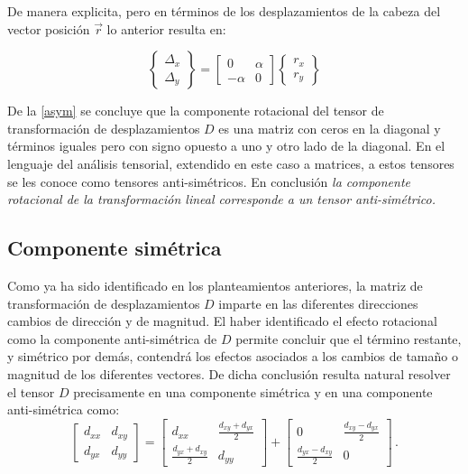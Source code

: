 \documentclass[../notas medios.tex]{subfiles}
\begin{document}
De manera explicita, pero en términos de los desplazamientos de la cabeza del vector posición $\vec{r}$ lo anterior resulta en:

\begin{equation}
\begin{Bmatrix}
\Delta_x\\
\Delta_y
\end{Bmatrix}=
\begin{bmatrix}
0 &\alpha \\
-\alpha &0
\end{bmatrix}
\begin{Bmatrix}
r_x\\
r_y
\end{Bmatrix}
\label{asym}
\end{equation}

De la \cref{asym} se concluye que la componente rotacional del tensor de 
transformación de desplazamientos $D$ es una matriz con ceros en la diagonal y 
términos iguales pero con signo opuesto a uno y otro lado de la diagonal. En el 
lenguaje del análisis tensorial, extendido en este caso a matrices, a estos 
tensores se les conoce como tensores anti-simétricos. En conclusión \emph{la 
componente rotacional de la transformación lineal corresponde a un tensor 
anti-simétrico.}


\subsection{Componente simétrica}
Como ya ha sido identificado en los planteamientos anteriores, la matriz de 
transformación de desplazamientos $D$ imparte en las diferentes direcciones 
cambios de dirección y de magnitud. El haber identificado el efecto rotacional 
como la componente anti-simétrica de $D$ permite concluir que el término 
restante, y simétrico por demás, contendrá los efectos asociados a los cambios 
de tamaño o magnitud de los diferentes vectores. De dicha conclusión resulta 
natural resolver el tensor $D$ precisamente en una componente simétrica y en 
una componente anti-simétrica como:
\begin{equation}
\begin{bmatrix}
d_{xx} &d_{xy}\\
d_{yx} &d_{yy}
\end{bmatrix} = \begin{bmatrix}
d_{xx} &\frac{d_{xy} + d_{yx}}{2}\\
\frac{d_{yx} + d_{xy}}{2} &d_{yy}
\end{bmatrix} + \begin{bmatrix}
0 &\frac{d_{xy} - d_{yx}}{2}\\
\frac{d_{yx} - d_{xy}}{2} &0
\end{bmatrix}\, .
\label{descomp}
\end{equation}
\end{document}
